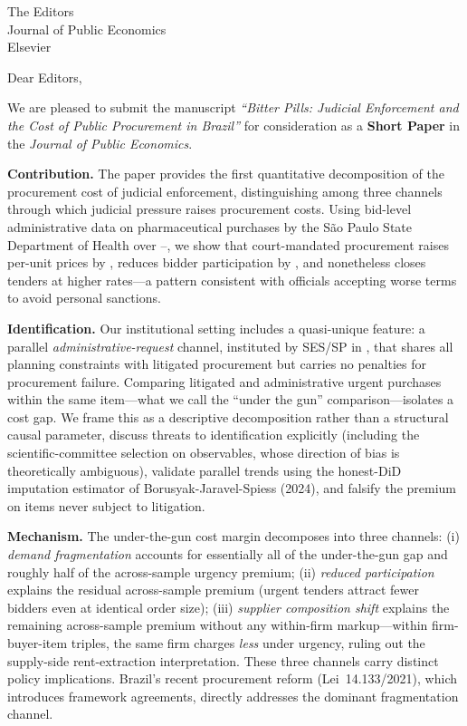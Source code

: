 \documentclass[11pt,a4paper]{letter}
\date{\BPsubmissionDate}
\begin{document}
\begin{letter}{The Editors \\ Journal of Public Economics \\ Elsevier}

\opening{Dear Editors,}

We are pleased to submit the manuscript \emph{``Bitter Pills: Judicial Enforcement and the Cost of Public Procurement in Brazil''} for consideration as a \textbf{Short Paper} in the \emph{Journal of Public Economics}.

\medskip\noindent\textbf{Contribution.} The paper provides the first quantitative decomposition of the procurement cost of judicial enforcement, distinguishing among three channels through which judicial pressure raises procurement costs. Using bid-level administrative data on \BPnPOIfull{} pharmaceutical purchases by the S\~ao Paulo State Department of Health over \BPsampleStartYear--\BPsampleEndYear, we show that court-mandated procurement raises per-unit prices by \BPnegPctHeadline, reduces bidder participation by \BPfirmsPctHeadline, and nonetheless closes tenders at higher rates---a pattern consistent with officials accepting worse terms to avoid personal sanctions.

\medskip\noindent\textbf{Identification.} Our institutional setting includes a quasi-unique feature: a parallel \emph{administrative-request} channel, instituted by SES/SP in \BPsampleStartYear, that shares all planning constraints with litigated procurement but carries no penalties for procurement failure. Comparing litigated and administrative urgent purchases within the same item---what we call the ``under the gun'' comparison---isolates a \BPutgPctRange{} cost gap. We frame this as a descriptive decomposition rather than a structural causal parameter, discuss threats to identification explicitly (including the scientific-committee selection on observables, whose direction of bias is theoretically ambiguous), validate parallel trends using the honest-DiD imputation estimator of Borusyak-Jaravel-Spiess (2024), and falsify the premium on items never subject to litigation.

\medskip\noindent\textbf{Mechanism.} The under-the-gun cost margin decomposes into three channels: (i) \emph{demand fragmentation} accounts for essentially all of the under-the-gun gap and roughly half of the across-sample urgency premium; (ii) \emph{reduced participation} explains the residual across-sample premium (urgent tenders attract \BPfirmsPanelBpct{} fewer bidders even at identical order size); (iii) \emph{supplier composition shift} explains the remaining across-sample premium without any within-firm markup---within firm-buyer-item triples, the same firm charges \BPtripleFirmBuyerItemPct{} \emph{less} under urgency, ruling out the supply-side rent-extraction interpretation. These three channels carry distinct policy implications. Brazil's recent procurement reform (Lei~14.133/2021), which introduces framework agreements, directly addresses the dominant fragmentation channel.


\end{letter}
\end{document}
